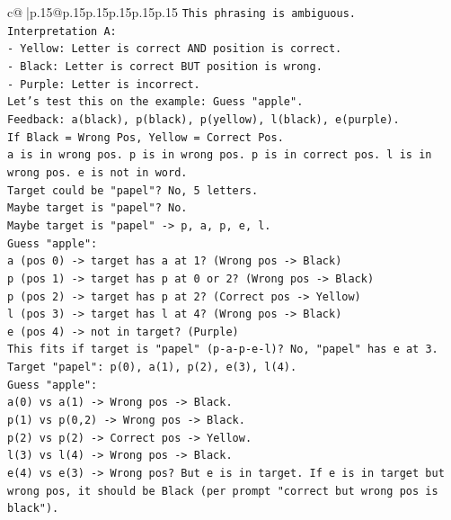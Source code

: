 \documentclass{article}
\begin{document}
{\begin{supertabular}{c@{$\;$}|p{.15\linewidth}@{}p{.15\linewidth}p{.15\linewidth}p{.15\linewidth}p{.15\linewidth}p{.15\linewidth}}
{{{\texttt{This phrasing is ambiguous.} \\
\texttt{Interpretation A:} \\
\texttt{{-} Yellow: Letter is correct AND position is correct.} \\
\texttt{{-} Black: Letter is correct BUT position is wrong.} \\
\texttt{{-} Purple: Letter is incorrect.} \\
\texttt{Let's test this on the example: Guess "apple".} \\
\texttt{Feedback: a(black), p(black), p(yellow), l(black), e(purple).} \\
\texttt{If Black = Wrong Pos, Yellow = Correct Pos.} \\
\texttt{a is in wrong pos. p is in wrong pos. p is in correct pos. l is in wrong pos. e is not in word.} \\
\texttt{Target could be "papel"? No, 5 letters.} \\
\texttt{Maybe target is "papel"? No.} \\
\texttt{Maybe target is "papel" {-}> p, a, p, e, l.} \\
\texttt{Guess "apple":} \\
\texttt{a (pos 0) {-}> target has a at 1? (Wrong pos {-}> Black)} \\
\texttt{p (pos 1) {-}> target has p at 0 or 2? (Wrong pos {-}> Black)} \\
\texttt{p (pos 2) {-}> target has p at 2? (Correct pos {-}> Yellow)} \\
\texttt{l (pos 3) {-}> target has l at 4? (Wrong pos {-}> Black)} \\
\texttt{e (pos 4) {-}> not in target? (Purple)} \\
\texttt{This fits if target is "papel" (p{-}a{-}p{-}e{-}l)? No, "papel" has e at 3.} \\
\texttt{Target "papel": p(0), a(1), p(2), e(3), l(4).} \\
\texttt{Guess "apple":} \\
\texttt{a(0) vs a(1) {-}> Wrong pos {-}> Black.} \\
\texttt{p(1) vs p(0,2) {-}> Wrong pos {-}> Black.} \\
\texttt{p(2) vs p(2) {-}> Correct pos {-}> Yellow.} \\
\texttt{l(3) vs l(4) {-}> Wrong pos {-}> Black.} \\
\texttt{e(4) vs e(3) {-}> Wrong pos? But e is in target. If e is in target but wrong pos, it should be Black (per prompt "correct but wrong pos is black").} \\
}}}
\end{supertabular}}
\end{document}
